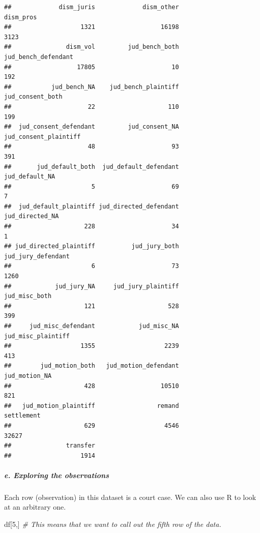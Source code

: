 \documentclass[
]{article}
\newenvironment{Shaded}{\begin{snugshade}}{\end{snugshade}}
\newcommand{\CommentTok}[1]{\textcolor[rgb]{0.56,0.35,0.01}{\textit{#1}}}
\newcommand{\DecValTok}[1]{\textcolor[rgb]{0.00,0.00,0.81}{#1}}
\newcommand{\NormalTok}[1]{#1}
\begin{document}
\begin{verbatim}
##             dism_juris             dism_other              dism_pros 
##                   1321                  16198                   3123 
##               dism_vol         jud_bench_both    jud_bench_defendant 
##                  17805                     10                    192 
##           jud_bench_NA    jud_bench_plaintiff       jud_consent_both 
##                     22                    110                    199 
##  jud_consent_defendant         jud_consent_NA  jud_consent_plaintiff 
##                     48                     93                    391 
##       jud_default_both  jud_default_defendant         jud_default_NA 
##                      5                     69                      7 
##  jud_default_plaintiff jud_directed_defendant        jud_directed_NA 
##                    228                     34                      1 
## jud_directed_plaintiff          jud_jury_both     jud_jury_defendant 
##                      6                     73                   1260 
##            jud_jury_NA     jud_jury_plaintiff          jud_misc_both 
##                    121                    528                    399 
##     jud_misc_defendant            jud_misc_NA     jud_misc_plaintiff 
##                   1355                   2239                    413 
##        jud_motion_both   jud_motion_defendant          jud_motion_NA 
##                    428                  10510                    821 
##   jud_motion_plaintiff                 remand             settlement 
##                    629                   4546                  32627 
##               transfer 
##                   1914
\end{verbatim}

\hypertarget{e.-exploring-the-observations}{%
\subparagraph{e. Exploring the
observations}\label{e.-exploring-the-observations}}

Each row (observation) in this dataset is a court case. We can also use
R to look at an arbitrary one.

\begin{Shaded}
\begin{Highlighting}[]
\NormalTok{df[}\DecValTok{5}\NormalTok{,] }\CommentTok{\# This means that we want to call out the fifth row of the data.}
\end{Highlighting}
\end{Shaded}
\end{document}
